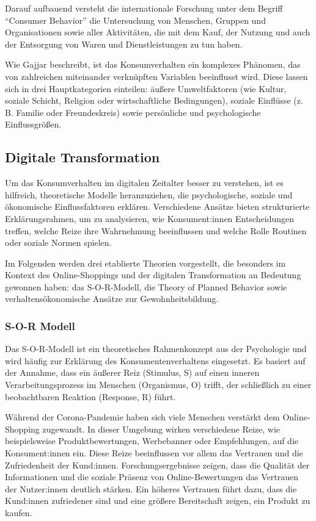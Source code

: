 Darauf aufbauend versteht die internationale Forschung unter dem Begriff \enquote{Consumer Behavior} die Untersuchung von Menschen, Gruppen und Organisationen sowie aller Aktivitäten, die mit dem Kauf, der Nutzung und auch der Entsorgung von Waren und Dienstleistungen zu tun haben.

Wie Gajjar beschreibt, ist das Konsumverhalten ein komplexes Phänomen, das von zahlreichen miteinander verknüpften Variablen beeinflusst wird. Diese lassen sich in drei Hauptkategorien einteilen: äußere Umweltfaktoren (wie Kultur, soziale Schicht, Religion oder wirtschaftliche Bedingungen), soziale Einflüsse (z. B. Familie oder Freundeskreis) sowie persönliche und psychologische Einflussgrößen. 

\subsection{Digitale Transformation}
Um das Konsumverhalten im digitalen Zeitalter besser zu verstehen, ist es hilfreich, theoretische Modelle heranzuziehen, die psychologische, soziale und ökonomische Einflussfaktoren erklären. Verschiedene Ansätze bieten strukturierte Erklärungsrahmen, um zu analysieren, wie Konsument:innen Entscheidungen treffen, welche Reize ihre Wahrnehmung beeinflussen und welche Rolle Routinen oder soziale Normen spielen. 

Im Folgenden werden drei etablierte Theorien vorgestellt, die besonders im Kontext des Online-Shoppings und der digitalen Transformation an Bedeutung gewonnen haben: 
das S-O-R-Modell, die Theory of Planned Behavior sowie verhaltensökonomische Ansätze zur Gewohnheitsbildung. 
\subsubsection{S-O-R Modell}
Das S-O-R-Modell ist ein theoretisches Rahmenkonzept aus der Psychologie und wird häufig zur Erklärung des Konsumentenverhaltens eingesetzt. Es basiert auf der Annahme, dass ein äußerer Reiz (Stimulus, S) auf einen inneren Verarbeitungsprozess im Menschen (Organismus, O) trifft, der schließlich zu einer beobachtbaren Reaktion (Response, R) führt.

Während der Corona-Pandemie haben sich viele Menschen verstärkt dem Online-Shopping zugewandt. In dieser Umgebung wirken verschiedene Reize, wie beispielsweise Produktbewertungen, Werbebanner oder Empfehlungen, auf die Konsument:innen ein. Diese Reize beeinflussen vor allem das Vertrauen und die Zufriedenheit der Kund:innen. Forschungsergebnisse zeigen, dass die Qualität der Informationen und die soziale Präsenz von Online-Bewertungen das Vertrauen der Nutzer:innen deutlich stärken. Ein höheres Vertrauen führt dazu, dass die Kund:innen zufriedener sind und eine größere Bereitschaft zeigen, ein Produkt zu kaufen.

